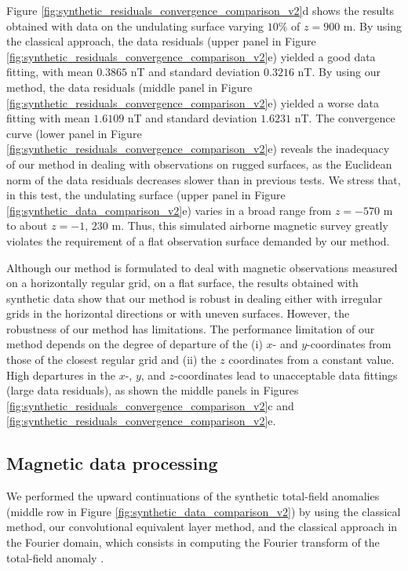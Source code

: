 Figure \ref{fig:synthetic_residuals_convergence_comparison_v2}d shows the results obtained
with data on the undulating surface varying $10\%$ of $z = 900$ m.
By using the classical approach, the data residuals (upper panel in 
Figure \ref{fig:synthetic_residuals_convergence_comparison_v2}e) 
yielded a good data fitting, with mean $0.3865$ nT and standard deviation $0.3216$ nT. 
By using our method, the data residuals (middle panel in 
Figure \ref{fig:synthetic_residuals_convergence_comparison_v2}e) yielded a worse data fitting 
with mean $1.6109$ nT and standard deviation $1.6231$ nT.
The convergence curve (lower panel in Figure \ref{fig:synthetic_residuals_convergence_comparison_v2}e)
reveals the inadequacy of our method in dealing with observations on rugged surfaces, as 
the Euclidean norm of the data residuals decreases slower than in previous tests. 
We stress that, in this test, the undulating surface (upper panel in Figure 
\ref{fig:synthetic_data_comparison_v2}e) varies in a broad range from $z = - 570$ m to about 
$z = -1,\, 230$ m. Thus, this simulated airborne magnetic survey greatly violates the requirement 
of a flat observation surface demanded by our method.

Although our method is formulated to deal with magnetic observations measured on 
a horizontally regular grid, on a flat surface, the results obtained with synthetic 
data show that our method is robust in dealing either with irregular grids in the 
horizontal directions or with uneven surfaces.
However, the robustness of our method has limitations.
The performance limitation of our method depends on the degree of 
departure of the (i) $x$- and $y$-coordinates from those of the closest 
regular grid and (ii) the $z$ coordinates from a constant value.
High departures in the $x$-, $y$, and $z$-coordinates lead to unacceptable 
data fittings (large data residuals), as shown the middle panels in Figures 
\ref{fig:synthetic_residuals_convergence_comparison_v2}c and
\ref{fig:synthetic_residuals_convergence_comparison_v2}e.

\subsection*{Magnetic data processing}

We performed the upward continuations of the synthetic total-field anomalies 
(middle row in Figure \ref{fig:synthetic_data_comparison_v2}) by using 
the classical method, our convolutional equivalent layer method, and 
the classical approach in the Fourier domain,
which consists in computing the Fourier transform of the total-field anomaly 
\citep[e.g.,][ p. 317]{blakely1996}. 

